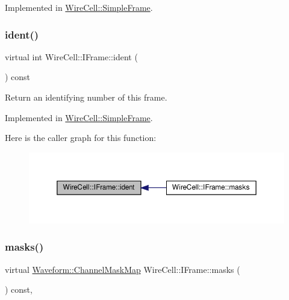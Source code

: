 Implemented in \hyperlink{class_wire_cell_1_1_simple_frame_ac52a4eab51683ef1b5bf746da3dcaec5}{Wire\+Cell\+::\+Simple\+Frame}.

\mbox{\label{class_wire_cell_1_1_i_frame_adbd5a27db1364bd8f5d89e1e7ca3c938}} 
\subsubsection{\texorpdfstring{ident()}{ident()}}
{\footnotesize\ttfamily virtual int Wire\+Cell\+::\+I\+Frame\+::ident (\begin{DoxyParamCaption}{ }\end{DoxyParamCaption}) const\hspace{0.3cm}{\ttfamily [pure virtual]}}



Return an identifying number of this frame. 



Implemented in \hyperlink{class_wire_cell_1_1_simple_frame_a66da8e8ce7a801019b6457ebd2381f6c}{Wire\+Cell\+::\+Simple\+Frame}.

Here is the caller graph for this function\+:
\nopagebreak
\begin{figure}[H]
\begin{center}
\leavevmode
\includegraphics[width=350pt]{class_wire_cell_1_1_i_frame_adbd5a27db1364bd8f5d89e1e7ca3c938_icgraph}
\end{center}
\end{figure}
\mbox{\label{class_wire_cell_1_1_i_frame_a577dd9839b5239799ee8c8e508b3a9e4}} 
\subsubsection{\texorpdfstring{masks()}{masks()}}
{\footnotesize\ttfamily virtual \hyperlink{namespace_wire_cell_1_1_waveform_a18b9ae61c858e340252ba3ac83ac3bc0}{Waveform\+::\+Channel\+Mask\+Map} Wire\+Cell\+::\+I\+Frame\+::masks (\begin{DoxyParamCaption}{ }\end{DoxyParamCaption}) const\hspace{0.3cm}{\ttfamily [inline]}, {\ttfamily [virtual]}}



